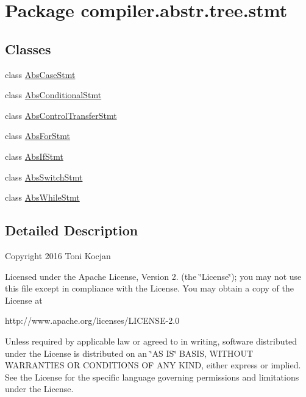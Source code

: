 \hypertarget{namespacecompiler_1_1abstr_1_1tree_1_1stmt}{}\section{Package compiler.\+abstr.\+tree.\+stmt}
\label{namespacecompiler_1_1abstr_1_1tree_1_1stmt}
\subsection*{Classes}
\begin{DoxyCompactItemize}
\item 
class \hyperlink{classcompiler_1_1abstr_1_1tree_1_1stmt_1_1_abs_case_stmt}{Abs\+Case\+Stmt}
\item 
class \hyperlink{classcompiler_1_1abstr_1_1tree_1_1stmt_1_1_abs_conditional_stmt}{Abs\+Conditional\+Stmt}
\item 
class \hyperlink{classcompiler_1_1abstr_1_1tree_1_1stmt_1_1_abs_control_transfer_stmt}{Abs\+Control\+Transfer\+Stmt}
\item 
class \hyperlink{classcompiler_1_1abstr_1_1tree_1_1stmt_1_1_abs_for_stmt}{Abs\+For\+Stmt}
\item 
class \hyperlink{classcompiler_1_1abstr_1_1tree_1_1stmt_1_1_abs_if_stmt}{Abs\+If\+Stmt}
\item 
class \hyperlink{classcompiler_1_1abstr_1_1tree_1_1stmt_1_1_abs_switch_stmt}{Abs\+Switch\+Stmt}
\item 
class \hyperlink{classcompiler_1_1abstr_1_1tree_1_1stmt_1_1_abs_while_stmt}{Abs\+While\+Stmt}
\end{DoxyCompactItemize}


\subsection{Detailed Description}
Copyright 2016 Toni Kocjan

Licensed under the Apache License, Version 2. (the \char`\"{}\+License\char`\"{}); you may not use this file except in compliance with the License. You may obtain a copy of the License at \begin{DoxyVerb}http://www.apache.org/licenses/LICENSE-2.0
\end{DoxyVerb}


Unless required by applicable law or agreed to in writing, software distributed under the License is distributed on an \char`\"{}\+A\+S I\+S\char`\"{} B\+A\+S\+IS, W\+I\+T\+H\+O\+UT W\+A\+R\+R\+A\+N\+T\+I\+ES OR C\+O\+N\+D\+I\+T\+I\+O\+NS OF A\+NY K\+I\+ND, either express or implied. See the License for the specific language governing permissions and limitations under the License.

